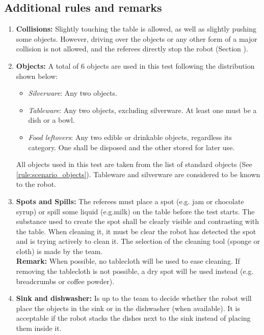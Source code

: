 \subsection{Additional rules and remarks}
\begin{enumerate}
	\item \textbf{Collisions:} Slightly touching the table is allowed, as well as slightly pushing some objects. However, driving over the objects or any other form of a major collision is not allowed, and the referees directly stop the robot (Section ).

	\item \textbf{Objects:} A total of 6 objects are used in this test following the distribution shown below:
	\begin{itemize}
		\item\textit{Silverware}: Any two objects.
		\item\textit{Tableware}: Any two objects, excluding silverware. At least one must be a dish or a bowl.
		\item\textit{Food leftovers}: Any two edible or drinkable objects, regardless its category. One shall be disposed and the other stored for later use.
	\end{itemize}
	All objects used in this test are taken from the list of standard objects (See \ref{rule:scenario_objects}). Tableware and silverware are considered to be known to the robot.

	\item \textbf{Spots and Spills:} The referees must place a spot (e.g. jam or chocolate syrup) or spill some liquid (e.g.milk) on the table before the test starts. The substance used to create the spot shall be clearly visible and contrasting with the table. When cleaning it, it must be clear the robot has detected the spot and is trying actively to clean it. The selection of the cleaning tool (sponge or cloth) is made by the team.\\
	\textbf{Remark:} When possible, no tablecloth will be used to ease cleaning. If removing the tablecloth is not possible, a dry spot will be used instead (e.g. breadcrumbs or coffee powder).

	\item \textbf{Sink and dishwasher:} Is up to the team to decide whether the robot will place the objects in the sink or in the dishwasher (when available). It is acceptable if the robot stacks the dishes next to the sink instead of placing them inside it.


\end{enumerate}
